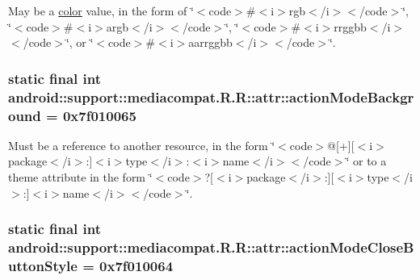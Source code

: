 May be a \hyperlink{classandroid_1_1support_1_1mediacompat_1_1_r_1_1color}{color} value, in the form of \char`\"{}$<$code$>$\#$<$i$>$rgb$<$/i$>$$<$/code$>$\char`\"{}, \char`\"{}$<$code$>$\#$<$i$>$argb$<$/i$>$$<$/code$>$\char`\"{}, \char`\"{}$<$code$>$\#$<$i$>$rrggbb$<$/i$>$$<$/code$>$\char`\"{}, or \char`\"{}$<$code$>$\#$<$i$>$aarrggbb$<$/i$>$$<$/code$>$\char`\"{}. \hypertarget{classandroid_1_1support_1_1mediacompat_1_1_r_1_1attr_56f6e12cf961a0ac742775e61592779b}{
\subsubsection[{actionModeBackground}]{\setlength{\rightskip}{0pt plus 5cm}static final int android::support::mediacompat.R.R::attr::actionModeBackground = 0x7f010065}}
\label{classandroid_1_1support_1_1mediacompat_1_1_r_1_1attr_56f6e12cf961a0ac742775e61592779b}


Must be a reference to another resource, in the form \char`\"{}$<$code$>$@\mbox{[}+\mbox{]}\mbox{[}$<$i$>$package$<$/i$>$:\mbox{]}$<$i$>$type$<$/i$>$:$<$i$>$name$<$/i$>$$<$/code$>$\char`\"{} or to a theme attribute in the form \char`\"{}$<$code$>$?\mbox{[}$<$i$>$package$<$/i$>$:\mbox{]}\mbox{[}$<$i$>$type$<$/i$>$:\mbox{]}$<$i$>$name$<$/i$>$$<$/code$>$\char`\"{}. \hypertarget{classandroid_1_1support_1_1mediacompat_1_1_r_1_1attr_c1bea456621ee857e44f171f3842a071}{
\subsubsection[{actionModeCloseButtonStyle}]{\setlength{\rightskip}{0pt plus 5cm}static final int android::support::mediacompat.R.R::attr::actionModeCloseButtonStyle = 0x7f010064}}
\label{classandroid_1_1support_1_1mediacompat_1_1_r_1_1attr_c1bea456621ee857e44f171f3842a071}


